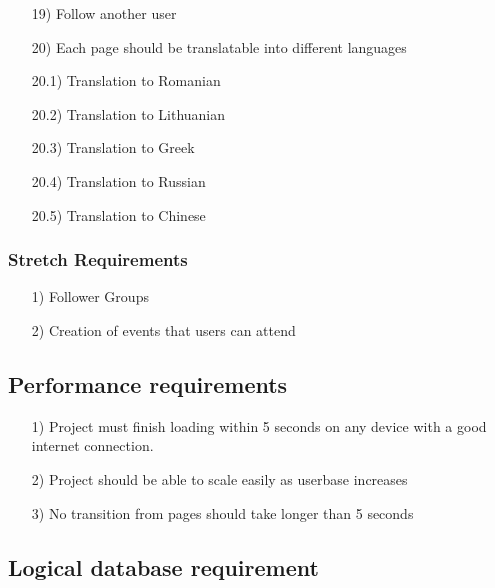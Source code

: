 \documentclass[10pt,a4paper]{article}
\begin{document}
\begin{itemize}
\item[19)]
Follow another user

\item[20)]
Each page should be translatable into different languages

\item[20.1)]
Translation to Romanian

\item[20.2)]
Translation to Lithuanian

\item[20.3)]
Translation to Greek

\item[20.4)]
Translation to Russian

\item[20.5)]
Translation to Chinese


\end{itemize}

\subsubsection{Stretch Requirements}

\begin{itemize}

\item[1)]
Follower Groups

\item[2)]
Creation of events that users can attend

\end{itemize}

\subsection{Performance requirements}

\begin{itemize}

\item[1)]
Project must finish loading within 5 seconds on any device with a good internet connection.

\item[2)]
Project should be able to scale easily as userbase increases

\item[3)]
No transition from pages should take longer than 5 seconds

\end{itemize}

\subsection{Logical database requirement}
\end{document}
